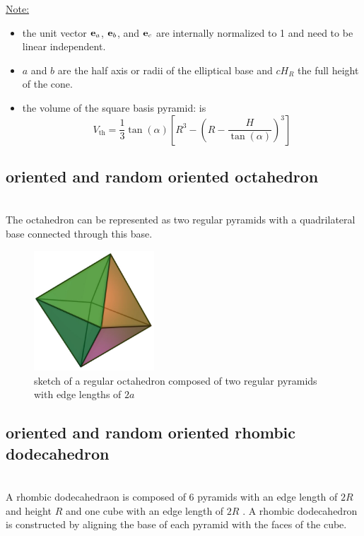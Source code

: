 \noindent\uline{Note:}
\begin{itemize}
\item the unit vector $\B{e}_a$, $\B{e}_b$, and $\B{e}_c$ are internally normalized to 1 and need to be linear independent.
\item $a$ and $b$ are the half axis or radii of the elliptical base and $cH_R$ the full height of the cone.
\item the volume of the square basis pyramid: is
$$V_\mathrm{th}=\frac{1}{3} \tan(\alpha) \left[R^3 - \left(R-\frac{H}{\tan(\alpha)}\right)^3 \right]  $$
\end{itemize}


\subsection{oriented and random oriented octahedron}
~\\
The octahedron can be represented as two regular pyramids with a quadrilateral base connected through this base.
\begin{figure}[htb]
\begin{center}
\includegraphics[width=0.4\textwidth]{../images/form_factor/oriented_primitive_opbjects/Octahedron.pdf}
\end{center}
\caption{sketch of a regular octahedron composed of two regular pyramids with edge lengths of $2a$}
\label{fig:opo_octahedron}
\end{figure}

\subsection{oriented and random oriented rhombic dodecahedron}
~\\

A rhombic dodecahedraon is composed of 6 pyramids with an edge length of $2R$ and height $R$ and one cube with an edge length of $2R$ \cite{Jones2010}. A rhombic dodecahedron is constructed by aligning the base of each pyramid with the faces of the cube.

